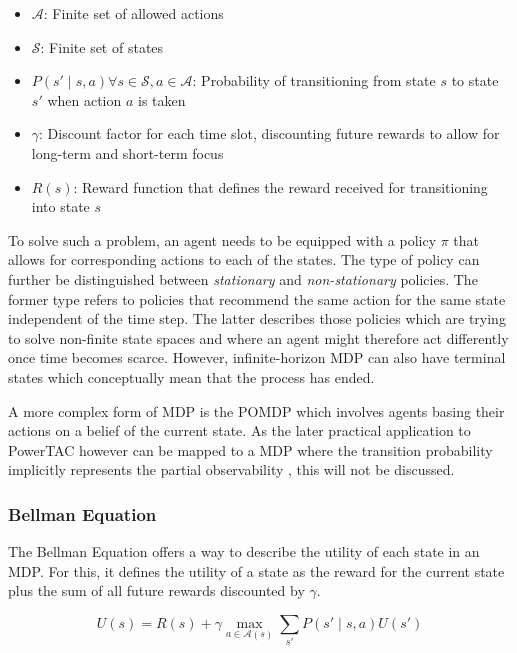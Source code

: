 \begin{itemize}
    \item $\mathcal{A}$: Finite set of allowed actions
    \item $\mathcal{S}$: Finite set of states
    \item $P(s' \mid s,a) \forall s \in \mathcal{S}, a \in \mathcal{A}$: Probability of transitioning from state
        $s$ to state $s'$ when action $a$ is taken
    \item $\gamma$: Discount factor for each time slot, discounting future rewards to allow for long-term and
        short-term focus
    \item $R(s)$: Reward function that defines the reward received for transitioning into state $s$
\end{itemize}

To solve such a problem, an agent needs to be equipped with a policy $\pi$ that allows for corresponding actions to each
of the states. The type of policy can further be distinguished between \emph{stationary} and \emph{non-stationary}
policies. The former type refers to policies that recommend the same action for the same state independent of the
time step. The latter describes those policies which are trying to solve non-finite state spaces and where an
agent might therefore act differently once time becomes scarce. However, infinite-horizon \ac{MDP} can also have
terminal states which conceptually mean that the process has ended.

A more complex form of \ac{MDP} is the \ac{POMDP} which involves agents basing their actions on a belief of the
current state. As the later practical application to \ac{PowerTAC}  however can be mapped to a \ac{MDP}
where the transition probability implicitly represents the partial observability \citep{tactexurieli2016mdp}, this will not be discussed.

\subsubsection{Bellman Equation}%
\label{ssub:bellman_equation}

The Bellman Equation offers a way to describe the utility of each state in an \ac{MDP}. For this, it defines the
utility of a state as the reward for the current state plus the sum of all future rewards discounted by $\gamma$.

\begin{equation}
    U(s) = R(s) + \gamma \max_{a\in\mathcal{A}(s)} \sum_{s'}{P(s' \mid s,a)U(s')}
\end{equation}

